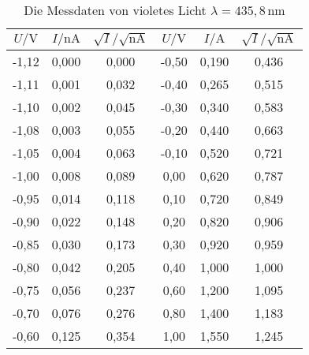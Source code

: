   \begin{table}[H]
    \centering
    \caption{Die Messdaten von violetes Licht $\lambda = 435,8 \,\text{nm}$ }
    \label{tab:violet}
    \begin{tabular}{| c | c |c||c|c|c| }
    \toprule
    $U/\mathrm{V}$ &$I/\mathrm{nA}$  &  $\sqrt{I}/\sqrt{\mathrm{nA}}$&$U/\mathrm{V}$ & $I/\mathrm{A} $& $\sqrt{I}/\sqrt{\mathrm{nA}}$  \\
    \midrule
    -1,12	& 0,000 &	0,000	& -0,50	& 0,190	& 0,436 \\
    -1,11	& 0,001 &	0,032	& -0,40	& 0,265	& 0,515 \\
    -1,10	& 0,002 &	0,045	& -0,30	& 0,340	& 0,583 \\
    -1,08	& 0,003 &	0,055	& -0,20	& 0,440	& 0,663 \\
    -1,05	& 0,004 &	0,063	& -0,10	& 0,520	& 0,721 \\
    -1,00	& 0,008 &	0,089	& 0,00	& 0,620	& 0,787 \\
    -0,95	& 0,014 &	0,118	& 0,10	& 0,720	& 0,849 \\
    -0,90	& 0,022 &	0,148	& 0,20	& 0,820	& 0,906 \\
    -0,85	& 0,030 &	0,173	& 0,30	& 0,920	& 0,959 \\
    -0,80	& 0,042 &	0,205	& 0,40	& 1,000	& 1,000 \\
    -0,75	& 0,056 &	0,237	& 0,60	& 1,200	& 1,095 \\
    -0,70	& 0,076 &	0,276	& 0,80	& 1,400	& 1,183 \\
    -0,60	& 0,125 &	0,354	& 1,00	& 1,550	& 1,245 \\
    
    

       \bottomrule
      \end{tabular}
    \end{table}

